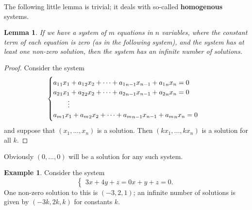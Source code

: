 \documentclass[a4paper,leqno]{article}
\numberwithin{equation}{section}
\newtheorem{lem}[equation]{Lemma}
\theoremstyle{definition}
\newtheorem{ex}[equation]{Example}
\theoremstyle{remark}
\newcommand{\df}[1]{\textbf{#1}}
\begin{document}
The following little lemma is trivial; it deals with so-called \df{homogenous} systems.
\begin{lem}\label{lem:homo}
  If we have a system of $ m $ equations in $ n $ variables, where the constant term of each equation is zero (as in the following system),
  and the system has at least one non-zero solution, then the system has an infinite number of solutions.
\end{lem}
\begin{proof}
  Consider the system
  \begin{equation}
    \begin{cases}
      {a_1}_1 x_1 + {a_1}_2 x_2 + \cdots + {a_1}_{n - 1} x_{n - 1} + {a_1}_n x_n = 0\\
      {a_2}_1 x_1 + {a_2}_2 x_2 + \cdots + {a_2}_{n - 1} x_{n - 1} + {a_2}_n x_n = 0\\
        \hspace{0.15em}\qquad\vdots\\
      {a_m}_1 x_1 + {a_m}_2 x_2 + \cdots + {a_m}_{n - 1} x_{n - 1} + {a_m}_n x_n = 0
    \end{cases}
  \end{equation}
  and suppose that $ (x_1, ..., x_n) $ is a solution. Then $ (kx_1, ..., kx_n) $ is a solution for all $ k $.
\end{proof}

Obviously $ (0, ..., 0) $ will be a solution for any such system.

\begin{ex}
  Consider the system
  \begin{equation}
    \begin{cases}
      3x + 4y + z = 0
      x + y + z = 0.
    \end{cases}
  \end{equation}
  One non-zero solution to this is $ (-3, 2, 1) $; an infinite number of solutions is given by $ (-3k, 2k, k) $ for constants $ k $.
\end{ex}
\end{document}
